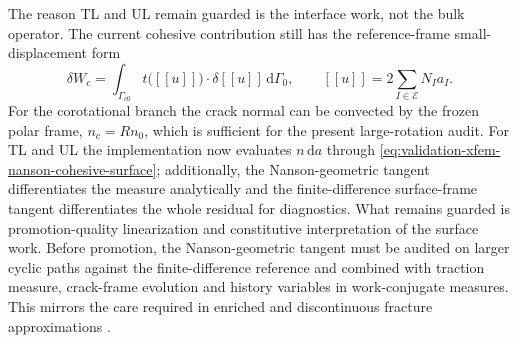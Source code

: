 The reason TL and UL remain guarded is the interface work, not the bulk
operator.  The current cohesive contribution still has the reference-frame
small-displacement form
\begin{equation}
  \delta W_c =
  \int_{\Gamma_{c0}}
    t\bigl(\left[\!\left[ u \right]\!\right]\bigr)\cdot
    \delta\left[\!\left[ u \right]\!\right]\,\mathrm{d}\Gamma_0,
  \qquad
  \left[\!\left[ u \right]\!\right] =
    2\sum_{I\in\mathcal{E}} N_I a_I .
  \label{eq:validation-xfem-cohesive-reference-work}
\end{equation}
For the corotational branch the crack normal can be convected by the frozen
polar frame, \(n_c=Rn_0\), which is sufficient for the present large-rotation
audit.  For TL and UL the implementation now evaluates \(n\,\mathrm{d}a\)
through \eqref{eq:validation-xfem-nanson-cohesive-surface}; additionally, the
Nanson-geometric tangent differentiates the measure analytically and the
finite-difference surface-frame tangent differentiates the whole residual for
diagnostics.  What remains guarded is promotion-quality linearization and
constitutive interpretation of the surface work.  Before promotion, the
Nanson-geometric tangent must be audited on larger cyclic paths against the
finite-difference reference and combined with traction measure, crack-frame
evolution and history variables in work-conjugate measures.  This mirrors the
care required in enriched and discontinuous fracture approximations
\cite{XFEM_Original_Moes1999,XFEM_Moes2000,XFEM_mohammadi2008,XFEM_RCapplication_Yu2018}.

